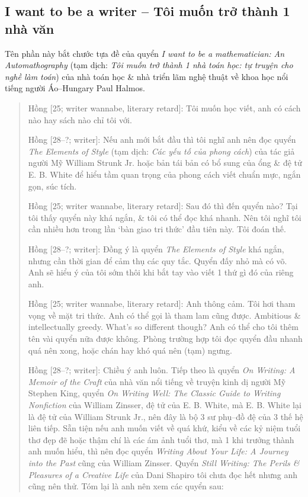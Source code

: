 \documentclass[12pt]{article}
\begin{document}
\subsection{I want to be a writer -- Tôi muốn trở thành 1 nhà văn}
Tên phần này bắt chước tựa đề của quyển {\it I want to be a mathematician: An Automathography} \cite{Halmos1985,Halmos1985_3_parts} (tạm dịch: {\it Tôi muốn trở thành 1 nhà toán học: tự truyện cho nghề làm toán}) của nhà toán học \& nhà triển lãm nghệ thuật về khoa học nổi tiếng người Áo--Hungary {\sc Paul Halmos}.
\begin{quote}
	{\sf Hồng [25; writer wannabe, literary retard]}: Tôi muốn học viết, anh có cách nào hay sách nào chỉ tôi với.
	
	{\sf Hồng [28--?; writer]}: Nếu anh mới bắt đầu thì tôi nghĩ anh nên đọc quyển {\it The Elements of Style} \cite{Strunk1918} (tạm dịch: {\it Các yếu tố của phong cách}) của tác giả người Mỹ {\sc William Strunk Jr.} hoặc bản tái bản có bổ sung \cite{Strunk_White2019} của ổng \& đệ tử {\sc E. B. White} để hiểu tầm quan trọng của phong cách viết chuẩn mực, ngắn gọn, súc tích.
	
	{\sf Hồng [25; writer wannabe, literary retard]}: Sau đó thì đến quyển nào? Tại tôi thấy quyển này khá ngắn, \& tôi có thể đọc khá nhanh. Nên tôi nghĩ tôi cần nhiều hơn trong lần `bàn giao tri thức' đầu tiên này. Tôi đoán thế.
	
	{\sf Hồng [28--?; writer]}: Đồng ý là quyển {\it The Elements of Style} khá ngắn, nhưng cần thời gian để cảm thụ các quy tắc. Quyển đấy nhỏ mà có võ. Anh sẽ hiểu ý của tôi sớm thôi khi bắt tay vào viết 1 thứ gì đó của riêng anh.
	
	{\sf Hồng [25; writer wannabe, literary retard]}: Anh thông cảm. Tôi hơi tham vọng về mặt tri thức. Anh có thể gọi là tham lam cũng được. Ambitious \& intellectually greedy. What's so different though? Anh có thể cho tôi thêm tên vài quyển nữa được không. Phòng trường hợp tôi đọc quyển đầu nhanh quá nên xong, hoặc chán hay khó quá nên (tạm) ngưng.
	
	{\sf Hồng [28--?; writer]}: Chiều ý anh luôn. Tiếp theo là quyển {\it On Writing: A Memoir of the Craft} \cite{King2000,King2010} của nhà văn nổi tiếng về truyện kinh dị người Mỹ {\sc Stephen King}, quyển {\it On Writing Well: The Classic Guide to Writing Nonfiction} \cite{Zinsser2001,Zinsser2016} của {\sc William Zinsser}, đệ tử của {\sc E. B. White}, mà {\sc E. B. White} lại là đệ tử của {\sc William Strunk Jr.}, nên đây là bộ 3 sư phụ--đồ đệ của 3 thế hệ liên tiếp. Sẵn tiện nếu anh muốn viết về quá khứ, kiểu về các kỷ niệm tuổi thơ đẹp đẽ hoặc thậm chí là các ám ảnh tuổi thơ, mà 1 khi trưởng thành anh muốn hiểu, thì nên đọc quyển {\it Writing About Your Life: A Journey into the Past} \cite{Zinsser2005} cũng của {\sc William Zinsser}. Quyển {\it Still Writing: The Perils \& Pleasures of a Creative Life} của {\sc Dani Shapiro} tôi chưa đọc hết nhưng anh cũng nên thử. Tóm lại là anh nên xem các quyển sau:
\end{quote}
\end{document}
